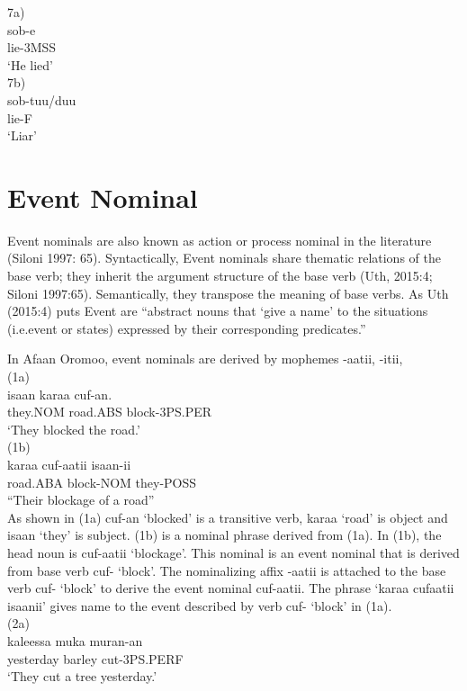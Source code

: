 \documentclass[11pt,a4paper]{article}
\begin{document}
7a) \\
\indent	sob-e\\
\indent lie-3MSS\\
\indent ‘He lied’\\

7b)	\\
\indent sob-tuu/duu \\
\indent lie-F\\
\indent ‘Liar’\\

\section{Event Nominal}
Event nominals are also known as action or process nominal in the literature (Siloni 1997: 65). Syntactically, Event nominals share thematic relations of the base verb; they inherit the argument structure of the base verb (Uth, 2015:4; Siloni 1997:65). Semantically, they transpose the meaning of base verbs. As Uth (2015:4) puts Event are “abstract nouns that ‘give a name’ to the situations (i.e.event or states) expressed by their corresponding predicates.”

In Afaan Oromoo, event nominals are derived by mophemes  -aatii, -itii, \\

(1a) 	\\
\indent isaan 		karaa 		cuf-an.\\
\indent they.NOM	road.ABS	block-3PS.PER\\
\indent ‘They blocked the road.’\\

(1b) 	\\
\indent karaa		cuf-aatii	isaan-ii\\
\indent road.ABA	block-NOM	they-POSS\\
\indent “Their blockage of a road”\\

As shown in (1a) cuf-an ‘blocked’ is a transitive verb, karaa ‘road’ is object and isaan ‘they’ is subject. (1b) is a nominal phrase derived from (1a). In (1b), the head noun is cuf-aatii ‘blockage’. This nominal is an event nominal that is derived from base verb cuf- ‘block’. The nominalizing affix -aatii is attached to the base verb cuf- ‘block’ to derive the event nominal cuf-aatii. The phrase ‘karaa cufaatii isaanii’ gives name to the event described by verb cuf- ‘block’ in (1a). \\

(2a) 	\\
\indent kaleessa 		muka 		muran-an\\
\indent yesterday		barley		cut-3PS.PERF\\
\indent ‘They cut a tree yesterday.’\\
\end{document}
